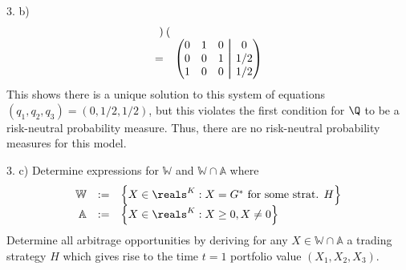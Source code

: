 \documentclass[11pt,a4paper]{article}
\newcommand\aug{\fboxsep=-\fboxrule\!\!\!\fbox{\strut}\!\!\!}
\begin{document}
\begin{answer}{3. b)}
\[\begin{array}{rl}
\begin{pmatrix}
    \end{pmatrix}\\
    =&\begin{pmatrix}
        0&1&0&\aug&0\\
        0&0&1&\aug&1/2\\
        1&0&0&\aug&1/2
    \end{pmatrix}\\
  \end{array}\]
  This shows there is a unique solution to this system of equations $(q_1,q_2,q_3)=(0,1/2,1/2)$, but this violates the first condition for $\Q$ to be a risk-neutral probability measure. Thus, there are no risk-neutral probability measures for this model.
\end{answer}

\begin{question}{3. c)}
  Determine expressions for $\mathbb{W}$ and $\mathbb{W}\cap\mathbb{A}$ where
  \[\begin{array}{rcl}
    \mathbb{W}&:=&\left\{X\in\reals^K:X=G^*\text{ for some strat. }H\right\}\\
    \mathbb{A}&:=&\left\{X\in\reals^K:X\geq0,X\neq0\right\}
  \end{array}\]
  Determine all arbitrage opportunities by deriving for any $X\in\mathbb{W}\cap\mathbb{A}$ a trading strategy $H$ which gives rise to the time $t=1$ portfolio value $(X_1,X_2,X_3)$.
\end{question}
\end{document}
